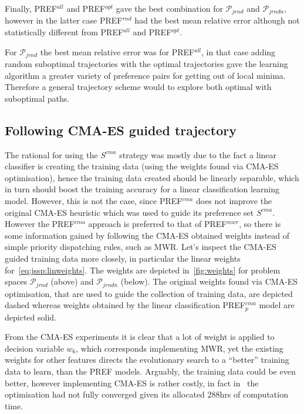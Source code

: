 \documentclass[letterpaper]{article}
\newcommand{\PREF}[2]{PREF$_{#2}^{#1}$}
\begin{document}
Finally, \PREF{all}{} and \PREF{opt}{} gave the best combination for $\mathcal{P}_{jrnd}$ and $\mathcal{P}_{jrndn}$, however in the latter case \PREF{rnd}{} had the best mean relative error although not statistically different from \PREF{all}{} and \PREF{opt}{}.

For $\mathcal{P}_{jrnd}$  the best mean relative error was for \PREF{all}{}, in that case adding random suboptimal trajectories with the optimal trajectories gave the learning algorithm a greater variety of preference pairs for getting out of local minima. Therefore a general trajectory scheme would to explore both optimal with suboptimal paths.

\subsection{Following CMA-ES guided trajectory}\label{sec:expr:cmaes}
The rational for using the $S^{cma}$ strategy was mostly due to the fact a linear classifier is creating the training data (using the weights found via CMA-ES optimisation), hence the training data created should be linearly separable, which in turn should boost the training accuracy for a linear classification learning model. However, this is not the case, since \PREF{cma}{} does not improve the original CMA-ES heuristic which 
was used to guide its preference set $S^{cma}$. However the \PREF{cma}{} approach is preferred to that of \PREF{mwr}{}, so there is some information gained by following the CMA-ES obtained weights instead of simple priority dispatching rules, such as MWR. 
%
Let's inspect the CMA-ES guided training data more closely, in particular the linear weights for~\cref{eq:jssp:linweights}. The weights are depicted in~\cref{fig:weights} for problem spaces $\mathcal{P}_{jrnd}$ (above) and $\mathcal{P}_{jrndn}$ (below). The original weights found via CMA-ES optimisation, that are used to guide the collection of training data, are depicted dashed whereas weights obtained by the linear classification \PREF{cma}{p} model are depicted solid. 

From the CMA-ES experiments it is clear that a lot of weight is applied to decision variable $w_6$, which corresponds implementing MWR, yet the existing weights for other features directs the evolutionary search to a ``better'' training data to learn, than the PREF models. Arguably, the training data could be even better, however implementing CMA-ES is rather costly, in fact in~\cite{InRu14a} the optimisation had not fully converged given its allocated 288hrs of computation time.
\end{document}
